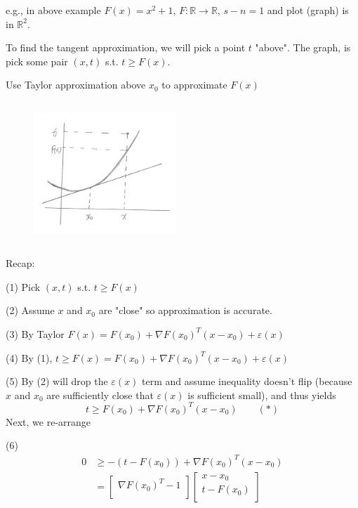 e.g., in above example $F(x) = x^2+1$, $F \colon \mathbb{R} \to \mathbb{R}$, $s-n=1$ and plot (graph) is in $\mathbb{R}^2$.

To find the tangent approximation, we will pick a point $t$ "above". The graph, is pick some pair $(x, t)$ s.t. $t \geq F(x)$.

Use Taylor approximation above $x_0$ to approximate $F(x)$ 

\begin{figure}
	\centering
	\includegraphics[width=2.1in,height=2.1in]{figures/ch02/p63.jpg}
\end{figure}

\vspace{0.5cm}
Recap:

(1) Pick $(x, t)$ s.t. $t \geq F(x)$
 
(2) Assume $x$ and $x_0$ are "close" so approximation is accurate.

(3) By Taylor
$F(x) = F(x_0) + \nabla F(x_0)^{T} (x-x_0) + \varepsilon(x)$

(4) By (1), $t \geq F(x) = F(x_0) + \nabla F(x_0)^{T} (x-x_0) + \varepsilon(x)$

(5) By (2) will drop the $\varepsilon(x)$ term and assume inequality doesn't flip (because $x$ and $x_0$ are sufficiently close that $\varepsilon(x)$ is sufficient small), and thus yields 
$$t \geq F(x_0) + \nabla F(x_0)^{T} (x-x_0)\qquad  (*)$$
Next, we re-arrange

(6)
\begin{align*}
0 &\geq -(t-F(x_0)) + \nabla F(x_0)^{T} (x - x_0) \\
&=\begin{bmatrix} \nabla F(x_0)^{T} -1\\ \end{bmatrix}  \begin{bmatrix} x-x_0\\ t-F(x_0)\\ \end{bmatrix} 
\end{align*}


